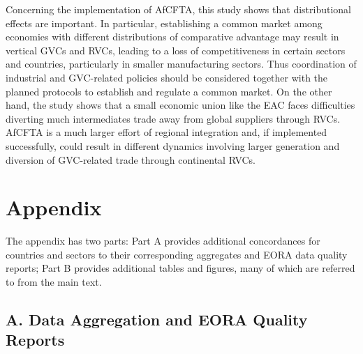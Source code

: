 \documentclass[a4paper]{article}
\begin{document}
Concerning the implementation of AfCFTA, this study shows that distributional effects are important. In particular, establishing a common market among economies with different distributions of comparative advantage may result in vertical GVCs and RVCs, leading to a loss of competitiveness in certain sectors and countries, particularly in smaller manufacturing sectors. Thus coordination of industrial and GVC-related policies should be considered together with the planned protocols to establish and regulate a common market. On the other hand, the study shows that a small economic union like the EAC faces difficulties diverting much intermediates trade away from global suppliers through RVCs. AfCFTA is a much larger effort of regional integration and, if implemented successfully, could result in different dynamics involving larger generation and diversion of GVC-related trade through continental RVCs. 


\newpage




\newpage
\section*{Appendix}

The appendix has two parts: Part A provides additional concordances for countries and sectors to their corresponding aggregates and EORA data quality reports; Part B provides additional tables and figures, many of which are referred to from the main text. 


\subsection*{A. Data Aggregation and EORA Quality Reports}
\setcounter{table}{0}
\renewcommand{\thetable}{A\arabic{table}}
\setcounter{figure}{0}
\renewcommand{\thefigure}{A\arabic{figure}}
\end{document}
